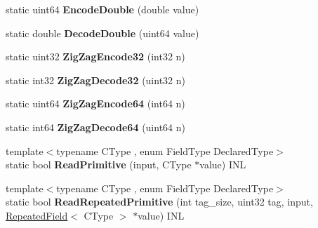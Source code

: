 \begin{DoxyCompactItemize}
static uint64 {\bfseries Encode\+Double} (double value)
\item 
\mbox{\label{classgoogle_1_1protobuf_1_1internal_1_1WireFormatLite_a5a1c1bc67505bc85fe8314bdcf0b8765}} 
static double {\bfseries Decode\+Double} (uint64 value)
\item 
\mbox{\label{classgoogle_1_1protobuf_1_1internal_1_1WireFormatLite_aebb6c1f337e3883c1f37ae6881f7b7cd}} 
static uint32 {\bfseries Zig\+Zag\+Encode32} (int32 n)
\item 
\mbox{\label{classgoogle_1_1protobuf_1_1internal_1_1WireFormatLite_a4ced561a1f82c66b6a483210effb79a7}} 
static int32 {\bfseries Zig\+Zag\+Decode32} (uint32 n)
\item 
\mbox{\label{classgoogle_1_1protobuf_1_1internal_1_1WireFormatLite_ac42ab165e5512aff266abcdcc05ff376}} 
static uint64 {\bfseries Zig\+Zag\+Encode64} (int64 n)
\item 
\mbox{\label{classgoogle_1_1protobuf_1_1internal_1_1WireFormatLite_a89069751d617554156a1a7ef9734064c}} 
static int64 {\bfseries Zig\+Zag\+Decode64} (uint64 n)
\item 
\mbox{\label{classgoogle_1_1protobuf_1_1internal_1_1WireFormatLite_a105ff35eb5c13e8b45c2b59f61b6ec4a}} 
{\footnotesize template$<$typename C\+Type , enum Field\+Type Declared\+Type$>$ }\\static bool {\bfseries Read\+Primitive} (input, C\+Type $\ast$value) I\+NL
\item 
\mbox{\label{classgoogle_1_1protobuf_1_1internal_1_1WireFormatLite_a1020f83d6b33ce3079df9c3ba7bb3472}} 
{\footnotesize template$<$typename C\+Type , enum Field\+Type Declared\+Type$>$ }\\static bool {\bfseries Read\+Repeated\+Primitive} (int tag\+\_\+size, uint32 tag, input, \hyperlink{classgoogle_1_1protobuf_1_1RepeatedField}{Repeated\+Field}$<$ C\+Type $>$ $\ast$value) I\+NL

\end{DoxyCompactItemize}
